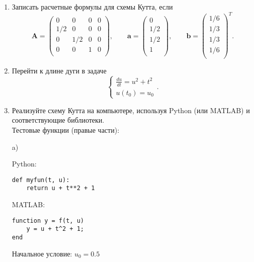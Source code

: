 \documentclass{article}
\begin{document}
\begin{enumerate}
\item Записать расчетные формулы для схемы Кутта, если
\begin{equation} \label{c2eq4}
	\mathbf{A} = 
		\begin{pmatrix}
		0 & 0 & 0 & 0 \\
		1/2 & 0 & 0 & 0 \\
		0 & 1/2 & 0 & 0 \\
		0 & 0 & 1 & 0 \\
		\end{pmatrix},
	\qquad
	\mathbf{a} = 
		\begin{pmatrix}
		0 \\
		1/2 \\
		1/2 \\
		1 \\
		\end{pmatrix},
	\qquad
	\mathbf{b} = 
		\begin{pmatrix}
		1/6 \\
		1/3 \\
		1/3 \\
		1/6 \\
		\end{pmatrix}^T.
\end{equation}
\item Перейти к длине дуги в задаче
\begin{equation} \label{c2eq5}
	\begin{cases}
		\displaystyle \frac{du}{dt} = u^2 + t^2 \\
		u(t_0) = u_0
	\end{cases}.
\end{equation}
\item Реализуйте схему Кутта на компьютере, используя Python (или MATLAB) и соответствующие библиотеки.\\
Тестовые функции (правые части):

a)  

Python:
\begin{verbatim}
def myfun(t, u):
    return u + t**2 + 1
\end{verbatim}

MATLAB:
\begin{matlablisting}
	\begin{Verbatim}
function y = f(t, u)
    y = u + t^2 + 1;
end
	\end{Verbatim}
\end{matlablisting}
Начальное условие: $u_0 = 0.5$


\end{enumerate}
\end{document}
